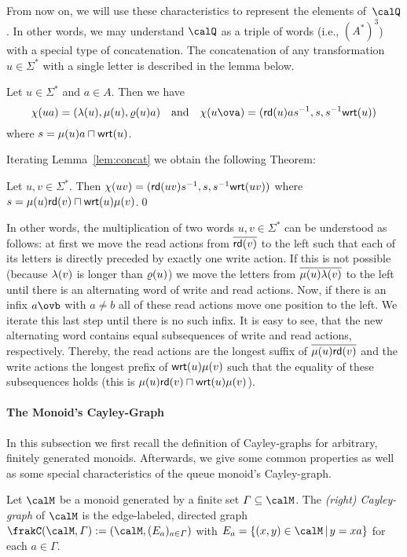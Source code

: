 From now on, we will use these characteristics to represent the elements of~$\Qx$. In other words, we may understand $\Qx$ as a triple of words (i.e., $(A^*)^3$) with a special type of concatenation. The concatenation of any transformation $u\in\varSigma^*$ with a single letter is described in the lemma below.
\begin{lemma}\label{lem:concat}
	Let $u\in\varSigma^*$ and $a\in A$. Then we have
	\[\chr{ua}=(\lft{u},\mddl{u},\rght{u}a)\quad\text{and}\quad \chr{u\ova}=(\rd{u}a\inv{s},s,\inv{s}\wrt{u})\]
	where $s=\mu(u)a\sqcap\mathsf{wrt}(u)$.
\end{lemma}

Iterating Lemma~\ref{lem:concat} we obtain the following Theorem:

\begin{theorem}\label{thm:concat}
	Let $u,v\in\varSigma^*$. Then
	$\chi(uv)=(\mathsf{rd}(uv)s^{-1},s,s^{-1}\mathsf{wrt}(uv))$
	where $s=\mu(u)\mathsf{rd}(v)\sqcap\mathsf{wrt}(u)\mu(v)$.\qed
\end{theorem}

In other words, the multiplication of two words $u,v\in\varSigma^*$ can be understood as follows: at first we move the read actions from $\overline{\mathsf{rd}(v)}$ to the left such that each of its letters is directly preceded by exactly one write action. If this is not possible (because $\lambda(v)$ is longer than $\varrho(u)$) we move the letters from $\overline{\mu(u)\lambda(v)}$ to the left until there is an alternating word of write and read actions. Now, if there is an infix $a\ovb$ with $a\neq b$ all of these read actions move one position to the left. We iterate this last step until there is no such infix. It is easy to see, that the new alternating word contains equal subsequences of write and read actions, respectively. Thereby, the read actions are the longest suffix of $\overline{\mu(u)\mathsf{rd}(v)}$ and the write actions the longest prefix of $\mathsf{wrt}(u)\mu(v)$ such that the equality of these subsequences holds (this is $\mu(u)\mathsf{rd}(v)\sqcap\mathsf{wrt}(u)\mu(v)$).

\paragraph*{The Monoid's Cayley-Graph}
In this subsection we first recall the definition of Cayley-graphs for arbitrary, finitely generated monoids. Afterwards, we give some common properties as well as some special characteristics of the queue monoid's Cayley-graph.

\begin{definition}
	Let $\calM$ be a monoid generated by a finite set $\varGamma\subseteq\calM$. The \emph{(right) Cayley-graph} of $\calM$ is the edge-labeled, directed graph $\cayley{\calM}{\varGamma}:=(\calM,(E_a)_{a\in\varGamma})$ with
	$E_a=\{(x,y)\in\calM\,|\,y=xa\}$
	for each $a\in\varGamma$.
\end{definition}

